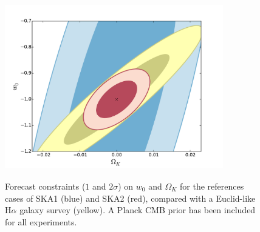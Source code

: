 \documentclass[useAMS,usenatbib]{mn2e}
\begin{document}
\begin{figure}
\begin{center}
\includegraphics[height=8.0cm,width=9.5cm]{plots/output_ellipse_w0_OK.pdf} 
\caption{Forecast constraints ($1$ and $2\sigma$) on $w_0$ and $\Omega_K$ for the references cases of SKA1 (blue) and SKA2 (red), compared with a Euclid-like H$\alpha$ galaxy survey (yellow). A Planck CMB prior has been included for all experiments.}
\label{Fig:w_ok}
\end{center}\vspace{-1em}
\end{figure}
\end{document}

